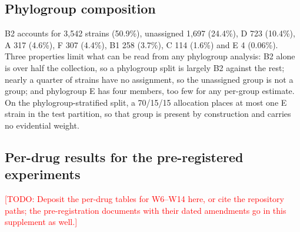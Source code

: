 \documentclass[11pt]{article}
\newcommand{\todo}[1]{\textcolor{red}{[TODO: #1]}}
\begin{document}
\subsection{Phylogroup composition}
B2 accounts for 3,542 strains (50.9\%), unassigned 1,697 (24.4\%), D 723 (10.4\%), A 317 (4.6\%),
F 307 (4.4\%), B1 258 (3.7\%), C 114 (1.6\%) and E 4 (0.06\%). Three properties limit what can be
read from any phylogroup analysis: B2 alone is over half the collection, so a phylogroup split is
largely B2 against the rest; nearly a quarter of strains have no assignment, so the unassigned group
is not a group; and phylogroup E has four members, too few for any per-group estimate. On the
phylogroup-stratified split, a 70/15/15 allocation places at most one E strain in the test
partition, so that group is present by construction and carries no evidential weight.

\subsection{Per-drug results for the pre-registered experiments}
\todo{Deposit the per-drug tables for W6--W14 here, or cite the repository paths; the
pre-registration documents with their dated amendments go in this supplement as well.}



\end{document}
